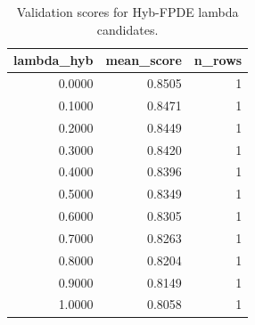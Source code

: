 \begin{table}[t]
\caption{Validation scores for Hyb-FPDE lambda candidates.}
\label{tab:lambda_distribution_computed}
\centering
\begin{tabular}{rrr}
\toprule
lambda\_hyb & mean\_score & n\_rows \\
\midrule
0.0000 & 0.8505 & 1 \\
0.1000 & 0.8471 & 1 \\
0.2000 & 0.8449 & 1 \\
0.3000 & 0.8420 & 1 \\
0.4000 & 0.8396 & 1 \\
0.5000 & 0.8349 & 1 \\
0.6000 & 0.8305 & 1 \\
0.7000 & 0.8263 & 1 \\
0.8000 & 0.8204 & 1 \\
0.9000 & 0.8149 & 1 \\
1.0000 & 0.8058 & 1 \\
\bottomrule
\end{tabular}

\end{table}

